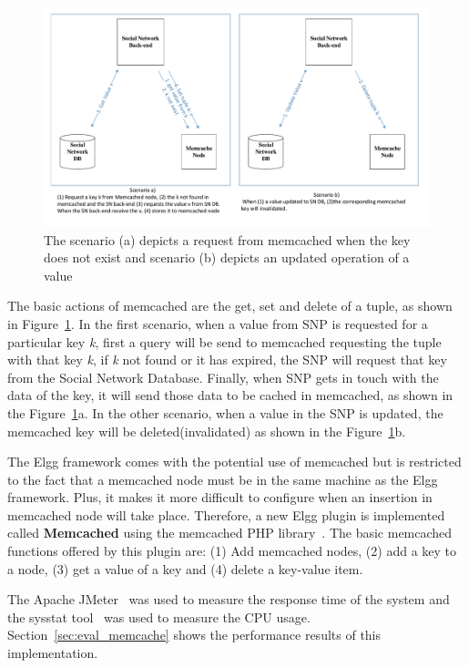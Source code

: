 \begin{figure}[h]
	\centering
	\includegraphics[width=1\textwidth]{./fig/memcached_key_value.pdf}
	\caption{The scenario (a) depicts a request from memcached when the key does not exist and scenario (b) depicts an updated operation of a value}
	\label{fig:memcache_key_value}
\end{figure}

The basic actions of memcached are the get, set and delete of a tuple, as shown in Figure~\ref{fig:memcache_key_value}. In the first scenario, when a value from SNP is requested for a particular key {\it k}, first a query will be send to memcached requesting the tuple with that key {\it k}, if {\it k} not found or it has expired, the SNP will request that key from the Social Network Database. Finally, when SNP gets in touch with the data of the key, it will send those data to be cached in memcached, as shown in the Figure~\ref{fig:memcache_key_value}a. In the other scenario, when a value in the SNP is updated, the memcached key will be deleted(invalidated) as shown in the Figure~\ref{fig:memcache_key_value}b.

The Elgg framework comes with the potential use of memcached but is restricted to the fact that a memcached node must be in the same machine as the Elgg framework. Plus, it makes it more difficult to configure when an insertion in memcached node will take place. Therefore, a new Elgg plugin is implemented called \textbf{Memcached} using the memcached PHP library~\cite{memcached_php_doc}. The basic memcached functions offered by this plugin are: (1) Add memcached nodes, (2) add a key to a node, (3) get a value of a key and (4) delete a key-value item. 

The Apache JMeter~\cite{jmeter_url} was used to measure the response time of the system and the sysstat tool~\cite{sysstat_url} was used to measure the CPU usage. Section~\ref{sec:eval_memcache} 
 shows the performance results of this implementation.

